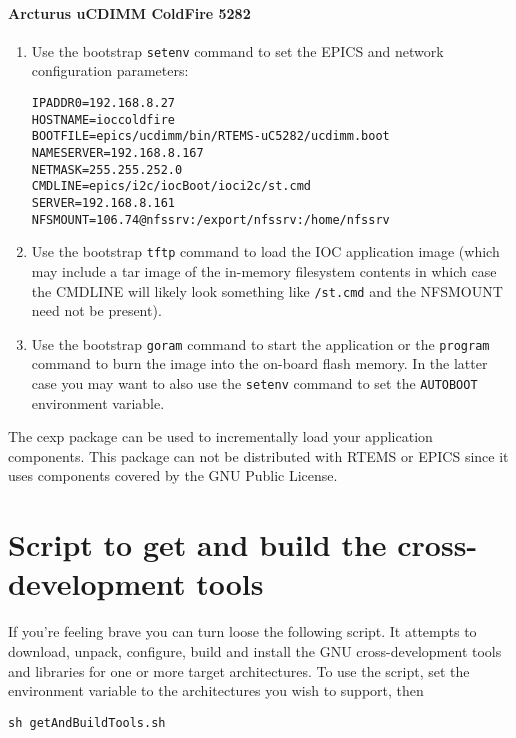 \documentclass{report}
\begin{document}
\subsubsection{Arcturus uCDIMM ColdFire 5282}
\begin{enumerate}
\item Use the bootstrap {\tt setenv} command to set the EPICS and network
configuration parameters:
\begin{verbatim}
IPADDR0=192.168.8.27
HOSTNAME=ioccoldfire
BOOTFILE=epics/ucdimm/bin/RTEMS-uC5282/ucdimm.boot
NAMESERVER=192.168.8.167
NETMASK=255.255.252.0
CMDLINE=epics/i2c/iocBoot/ioci2c/st.cmd
SERVER=192.168.8.161
NFSMOUNT=106.74@nfssrv:/export/nfssrv:/home/nfssrv
\end{verbatim}
\item Use the bootstrap {\tt tftp} command to load the IOC application image
(which may include a tar image of the in-memory filesystem contents in which case the CMDLINE will likely look something like {\tt /st.cmd} and the NFSMOUNT need not be present).
\item Use the bootstrap {\tt goram} command to start the application or the
{\tt program} command to burn the image into the on-board flash memory.  In
the latter case you may want to also use the {\tt setenv} command to set the
{\tt AUTOBOOT} environment variable.
\end{enumerate}

The cexp package can be used to
incrementally load your application components.  This package can not
be distributed with RTEMS or EPICS since it uses components covered by
the GNU Public License.


\appendix
\chapter{Script to get and build the cross-development tools}
\label{getAndBuildTools}
If you're feeling brave you can turn loose the following script.  It attempts
to download, unpack, configure, build and install the GNU cross-development
tools and libraries for one or more target architectures.  To use
the script, set the \verb@ARCHS@ 
environment variable to the architectures you wish to support, then 
\begin{verbatim}
sh getAndBuildTools.sh
\end{verbatim}
\end{document}
